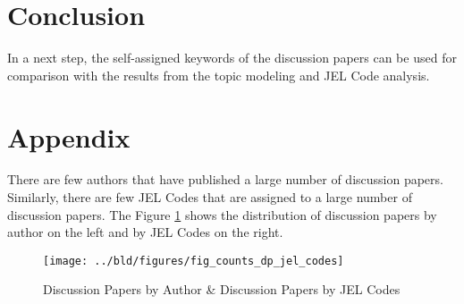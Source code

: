 \documentclass[11pt, a4paper, leqno]{article}
\begin{document}
\section{Conclusion}
In a next step, the self-assigned keywords of the discussion papers can be used for comparison with the results from the topic modeling and JEL Code analysis.

\printbibliography

\section{Appendix}

There are few authors that have published a large number of discussion papers.
Similarly, there are few JEL Codes that are assigned to a large number of discussion papers.
The Figure \ref{fig:counts_dp_jel_codes} shows the distribution of discussion papers by author on the left and by JEL Codes on the right.

\begin{figure}
    \centering
    \texttt{[image: ../bld/figures/fig\_counts\_dp\_jel\_codes]}
    \caption{Discussion Papers by Author \& Discussion Papers by JEL Codes}
    \label{fig:counts_dp_jel_codes}
\end{figure}
\end{document}
